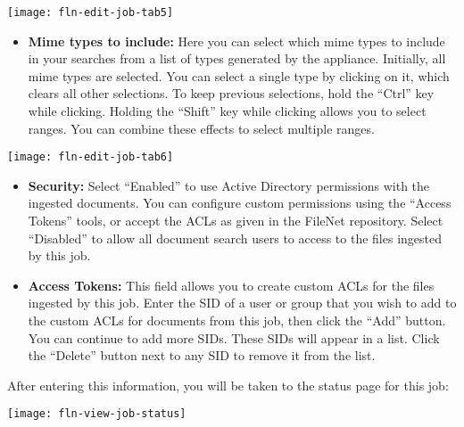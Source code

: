 \texttt{[image: fln-edit-job-tab5]}

\begin{itemize}

\item \textbf{Mime types to include:}
Here you can select which mime types to include in your searches from
a list of types generated by the appliance. Initially, all mime types
are selected. You can select a single type by clicking on it, which
clears all other selections. To keep previous selections, hold the
``Ctrl'' key while clicking. Holding the ``Shift'' key while clicking
allows you to select ranges. You can combine these effects to select
multiple ranges.


\end{itemize}

\texttt{[image: fln-edit-job-tab6]}

\begin{itemize}



\item \textbf{Security:} Select ``Enabled'' to use Active Directory
permissions with the ingested documents. You can configure custom
permissions using the ``Access Tokens'' tools, or accept the ACLs
as given in the FileNet repository. Select ``Disabled'' to allow all
document search users to access to the files ingested by this job.


\item \textbf{Access Tokens:} This field allows you to create custom ACLs
for the files ingested by this job. Enter the SID of a user or group
that you wish to add to the custom ACLs for documents from this job,
then click the ``Add'' button. You can continue to add more SIDs. These
SIDs will appear in a list. Click the ``Delete'' button next to any SID
to remove it from the list.

\end{itemize}


After entering this information, you will be taken to the status page
for this job:

\texttt{[image: fln-view-job-status]}


